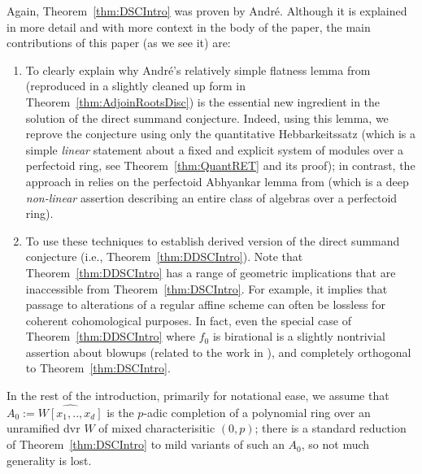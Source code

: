 \documentclass[10pt,reqno]{amsart}
\begin{document}
\begin{remark}
Again, Theorem~\ref{thm:DSCIntro} was proven by Andr\'e. Although it is explained in more detail and with more context in the body of the paper, the main contributions of this paper (as we see it) are:

\begin{enumerate}
\item To clearly explain why Andr\'e's relatively simple flatness lemma from \cite[\S 2.5]{AndreDSC} (reproduced in a slightly cleaned up form in Theorem~\ref{thm:AdjoinRootsDisc}) is the essential new ingredient in the solution of the direct summand conjecture. Indeed, using this lemma, we reprove the conjecture using only the quantitative Hebbarkeitssatz (which is a simple {\em linear} statement about a fixed and explicit system of modules over a perfectoid ring, see Theorem~\ref{thm:QuantRET} and its proof); in contrast, the approach in \cite{AndreDSC} relies on the perfectoid Abhyankar lemma from  \cite{AndrePAL} (which is a deep {\em non-linear} assertion describing an entire class of algebras over a perfectoid ring).

\item To use these techniques to establish derived version of the direct summand conjecture (i.e., Theorem~\ref{thm:DDSCIntro}). Note that Theorem~\ref{thm:DDSCIntro} has a range of geometric implications that are inaccessible from Theorem~\ref{thm:DSCIntro}. For example, it implies that passage to alterations of a regular affine scheme can  often be lossless for coherent cohomological purposes. In fact, even the special case of Theorem~\ref{thm:DDSCIntro} where $f_0$ is birational is a slightly nontrivial assertion about blowups (related to the work in \cite{CRHDIMixedChar}), and completely orthogonal to Theorem~\ref{thm:DSCIntro}.

\end{enumerate}

\end{remark}



\begin{assumption}
In the rest of the introduction, primarily for notational ease, we assume that $A_0 := \widehat{W[x_1,..,x_d]}$ is the $p$-adic completion of a polynomial ring over an unramified dvr $W$ of  mixed characterisitic $(0,p)$; there is a standard reduction of Theorem~\ref{thm:DSCIntro} to mild variants of such an $A_0$, so not much generality is lost. 
\end{assumption}
\end{document}
